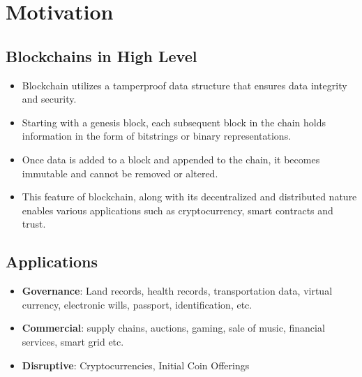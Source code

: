\documentclass{article}
\begin{document}
\section{Motivation}
\subsection{Blockchains in High Level}
\begin{itemize}
    \item Blockchain utilizes a tamperproof data structure that ensures data integrity and security.
    \item Starting with a genesis block, each subsequent block in the chain holds information in the form of bitstrings or binary representations.
    \item Once data is added to a block and appended to the chain, it becomes immutable and cannot be removed or altered.
    \item This feature of blockchain, along with its decentralized and distributed nature enables various applications such as cryptocurrency, smart contracts and trust.
\end{itemize}
\subsection{Applications}
\begin{itemize}
    \item \textbf{Governance}: Land records, health records, transportation data, virtual currency, electronic wills, passport, identification, etc.
    \item \textbf{Commercial}: supply chains, auctions, gaming, sale of music, financial services, smart grid etc.
    \item \textbf{Disruptive}: Cryptocurrencies, Initial Coin Offerings
\end{itemize}
\end{document}
